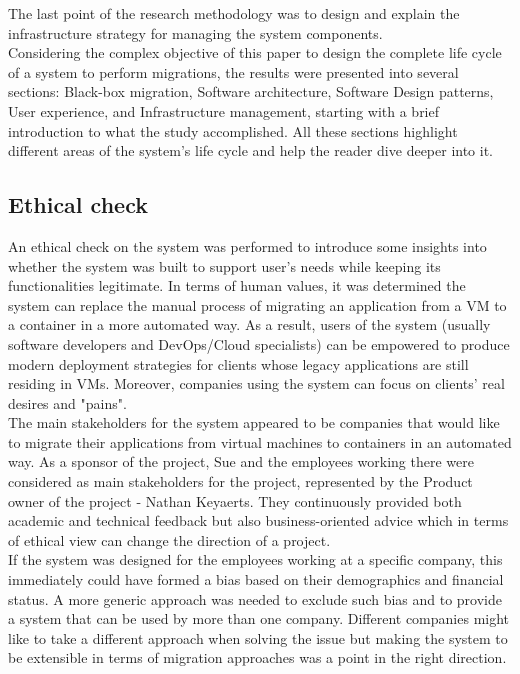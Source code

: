 \documentclass[twocolumn]{article}
\begin{document}
The last point of the research methodology was to design and explain the infrastructure strategy for managing the system components. \\

Considering the complex objective of this paper to design the complete life cycle of a system to perform migrations, the results were presented into several sections: Black-box migration, Software architecture, Software Design patterns, User experience, and Infrastructure management, starting with a brief introduction to what the study accomplished. All these sections highlight different areas of the system's life cycle and help the reader dive deeper into it.

\subsection{Ethical check}
An ethical check on the system was performed to introduce some insights into whether the system was built to support user's needs while keeping its functionalities legitimate. In terms of human values, it was determined the system can replace the manual process of migrating an application from a VM to a container in a more automated way. As a result, users of the system (usually software developers and DevOps/Cloud specialists) can be empowered to produce modern deployment strategies for clients whose legacy applications are still residing in VMs. Moreover, companies using the system can focus on clients' real desires and "pains".\\

The main stakeholders for the system appeared to be companies that would like to migrate their applications from virtual machines to containers in an automated way. As a sponsor of the project, Sue and the employees working there were considered as main stakeholders for the project, represented by the Product owner of the project - Nathan Keyaerts. They continuously provided both academic and technical feedback but also business-oriented advice which in terms of ethical view can change the direction of a project.\\

If the system was designed for the employees working at a specific company, this immediately could have formed a bias based on their demographics and financial status. A more generic approach was needed to exclude such bias and to provide a system that can be used by more than one company. Different companies might like to take a different approach when solving the issue but making the system to be extensible in terms of migration approaches was a point in the right direction.\\
\end{document}
